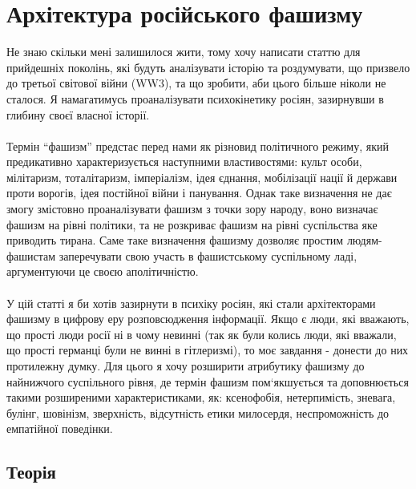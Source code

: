 \section{Архітектура російського фашизму}

Не знаю скільки мені залишилося жити, тому хочу написати статтю для прийдешніх поколінь,
які будуть аналізувати історію та роздумувати, що призвело до третьої світової війни (WW3),
та що зробити, аби цього більше ніколи не сталося. Я намагатимусь проаналізувати
психокінетику росіян, зазирнувши в глибину своєї власної історії.
\\
\\
Термін “фашизм” предстає перед нами як різновид політичного режиму, який предикативно
характеризується наступними властивостями: культ особи, мілітаризм, тоталітаризм,
імперіалізм, ідея єднання, мобілізації нації й держави проти ворогів, ідея постійної
війни і панування. Однак таке визначення не дає змогу змістовно проаналізувати фашизм
з точки зору народу, воно визначає фашизм на рівні політики, та не розкриває фашизм
на рівні суспільства яке приводить тирана. Саме таке визначення фашизму дозволяє
простим людям-фашистам заперечувати свою участь в фашистському суспільному ладі,
аргументуючи це своєю аполітичністю.
\\
\\
У цій статті я би хотів зазирнути в психіку росіян, які стали архітекторами фашизму
в цифрову еру розповсюдження інформації. Якщо є люди, які вважають, що прості люди
росії ні в чому невинні (так як були колись люди, які вважали, що прості германці
були не винні в гітлеризмі), то моє завдання - донести до них протилежну думку.
Для цього я хочу розширити атрибутику фашизму до найнижчого суспільного рівня,
де термін фашизм пом`якшується та доповнюється такими розширеними характеристиками,
як: ксенофобія, нетерпимість, зневага, булінг, шовінізм, зверхність, відсутність
етики милосердя, неспроможність до емпатійної поведінки.

\subsection{Теорія}

